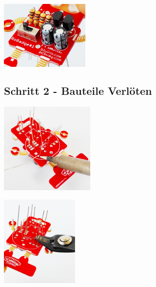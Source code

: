 \documentclass[a4paper]{article}
\begin{document}
\begin{minipage}[t]{\textwidth}
  \centering
  \includegraphics[width=0.33\textwidth]{../pictures/Bestueckung.jpg}
  \label{img:Bestueckung}
\end{minipage}
\subsection{Schritt 2 - Bauteile Verlöten}
\begin{minipage}[t]{0.28\textwidth}
  \centering
  \includegraphics[height=4.5cm]{../pictures/Loeten.jpg}
  \label{img:Loeten}
  \end{minipage}
\begin{minipage}[t]{0.33\textwidth}
  \centering
  \includegraphics[height=4.5cm]{../pictures/Cut.jpg}
  \label{img:Cut}
\end{minipage}
\ \\
\end{document}
